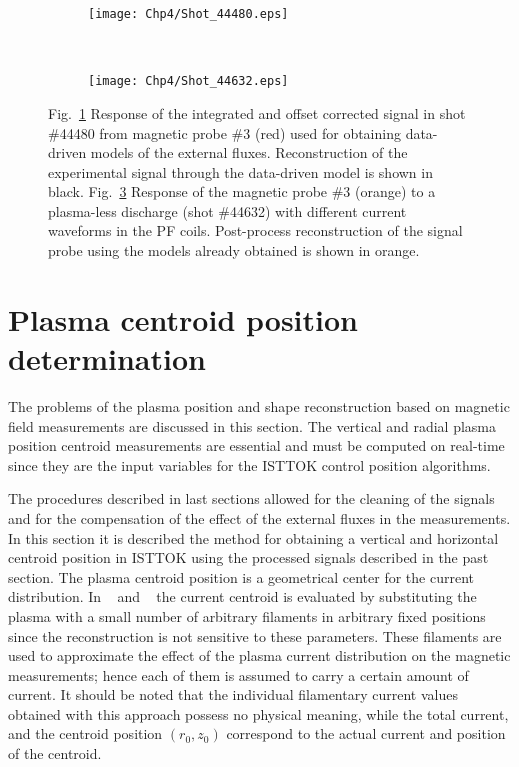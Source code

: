 \begin{figure}
	\begin{subfigure}[b]{0.47\textwidth}
		\texttt{[image: Chp4/Shot\_44480.eps]}  
		\caption{\label{fig:44480} }
	\end{subfigure}
~
	\begin{subfigure}[b]{0.47\textwidth}
		\texttt{[image: Chp4/Shot\_44632.eps]}        
		\caption{\label{fig:44632}}
	\end{subfigure}
	
	\caption{Fig.~\ref{fig:44480} Response of the integrated and offset corrected signal in shot \#44480 from magnetic probe \#3 (red) used for obtaining data-driven models of the external fluxes. Reconstruction of the experimental signal through the data-driven model is shown in black. Fig.~\ref{fig:44632} Response of the  magnetic probe \#3 (orange) to a plasma-less discharge (shot \#44632) with different current waveforms in the PF coils. Post-process reconstruction of the  signal probe using the  models already obtained   is shown in orange. }
\end{figure}


\section{Plasma centroid position determination}

The problems of the plasma position and shape reconstruction based on magnetic field measurements are discussed in this section. The vertical and radial plasma position centroid measurements are essential and must be computed on real-time since they are the input variables for the ISTTOK control position algorithms.\smallskip

The procedures described in last sections allowed for the cleaning of the signals and for the compensation of the effect of the external fluxes in the measurements. In this section it is described the method for obtaining a vertical and horizontal centroid position in ISTTOK using the processed signals described in the past section.  The plasma centroid position  is a geometrical center for the current distribution. In ~\cite{Pironti1995} and ~\cite{Swain1982}  the current centroid is evaluated  by substituting the plasma with a small number of arbitrary filaments in arbitrary fixed positions since the reconstruction is not sensitive to these parameters. These filaments are used to approximate the effect of the plasma current distribution on the magnetic measurements; hence each of them is assumed to carry a certain amount of current. It should be noted that the individual filamentary current values obtained with this approach possess no physical meaning, while the total current, and the centroid position $(r_0,z_0)$ correspond to the actual current and position of the centroid.\smallskip

